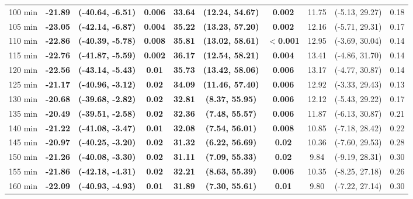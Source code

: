 \begin{table}[ht]
{\begin{tabular}{lccccccccc}
100 min & \textbf{-21.89} & \textbf{(-40.64, -6.51)} & \textbf{0.006} & \textbf{33.64} & \textbf{(12.24, 54.67)} & \textbf{0.002} & 11.75 & (-5.13, 29.27) & 0.18 \\
105 min & \textbf{-23.05} & \textbf{(-42.14, -6.87)} & \textbf{0.004} & \textbf{35.22} & \textbf{(13.23, 57.20)} & \textbf{0.002} & 12.16 & (-5.71, 29.31) & 0.17 \\
110 min & \textbf{-22.86} & \textbf{(-40.39, -5.78)} & \textbf{0.008} & \textbf{35.81} & \textbf{(13.02, 58.61)} & \textbf{$<$0.001} & 12.95 & (-3.69, 30.04) & 0.14 \\
115 min & \textbf{-22.76} & \textbf{(-41.87, -5.59)} & \textbf{0.002} & \textbf{36.17} & \textbf{(12.54, 58.21)} & \textbf{0.004} & 13.41 & (-4.86, 31.70) & 0.14 \\
120 min & \textbf{-22.56} & \textbf{(-43.14, -5.43)} & \textbf{0.01} & \textbf{35.73} & \textbf{(13.42, 58.06)} & \textbf{0.006} & 13.17 & (-4.77, 30.87) & 0.14 \\
125 min & \textbf{-21.17} & \textbf{(-40.96, -3.12)} & \textbf{0.02} & \textbf{34.09} & \textbf{(11.46, 57.40)} & \textbf{0.006} & 12.92 & (-3.33, 29.43) & 0.13 \\
130 min & \textbf{-20.68} & \textbf{(-39.68, -2.82)} & \textbf{0.02} & \textbf{32.81} & \textbf{(8.37, 55.95)} & \textbf{0.006} & 12.12 & (-5.43, 29.22) & 0.17 \\
135 min & \textbf{-20.49} & \textbf{(-39.51, -2.58)} & \textbf{0.02} & \textbf{32.36} & \textbf{(7.48, 55.57)} & \textbf{0.006} & 11.87 & (-6.13, 30.87) & 0.21 \\
140 min & \textbf{-21.22} & \textbf{(-41.08, -3.47)} & \textbf{0.01} & \textbf{32.08} & \textbf{(7.54, 56.01)} & \textbf{0.008} & 10.85 & (-7.18, 28.42) & 0.22 \\
145 min & \textbf{-20.97} & \textbf{(-40.25, -3.20)} & \textbf{0.02} & \textbf{31.32} & \textbf{(6.22, 56.69)} & \textbf{0.02} & 10.36 & (-7.60, 29.53) & 0.28 \\
150 min & \textbf{-21.26} & \textbf{(-40.08, -3.30)} & \textbf{0.02} & \textbf{31.11} & \textbf{(7.09, 55.33)} & \textbf{0.02} & 9.84 & (-9.19, 28.31) & 0.30 \\
155 min & \textbf{-21.86} & \textbf{(-42.18, -4.31)} & \textbf{0.02} & \textbf{32.21} & \textbf{(8.63, 55.39)} & \textbf{0.006} & 10.35 & (-8.25, 27.18) & 0.26 \\
160 min & \textbf{-22.09} & \textbf{(-40.93, -4.93)} & \textbf{0.01} & \textbf{31.89} & \textbf{(7.30, 55.61)} & \textbf{0.01} & 9.80 & (-7.22, 27.14) & 0.30 \\

\end{tabular}}
\end{table}
